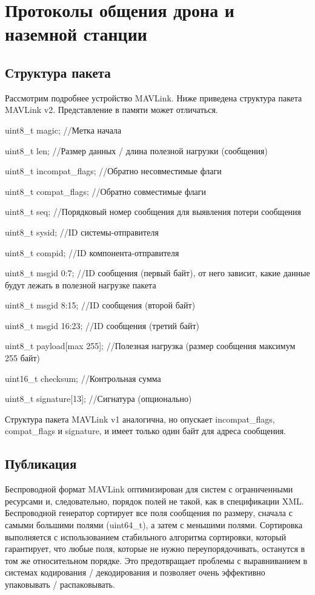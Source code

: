 
\section{Протоколы общения дрона и наземной станции}
\subsection{Структура пакета}
Рассмотрим подробнее устройство MAVLink. Ниже приведена структура пакета MAVLink v2. Представление в памяти может отличаться.

uint8\_t magic;              //Метка начала

uint8\_t len;                //Размер данных / длина полезной нагрузки (сообщения)

uint8\_t incompat\_flags;     //Обратно несовместимые флаги

uint8\_t compat\_flags;       //Обратно совместимые флаги

uint8\_t seq;                //Порядковый номер сообщения для выявления потери сообщения

uint8\_t sysid;              //ID системы-отправителя

uint8\_t compid;             //ID компонента-отправителя

uint8\_t msgid 0:7;          //ID сообщения (первый байт), от него зависит, какие данные будут лежать в полезной нагрузке пакета

uint8\_t msgid 8:15;         //ID сообщения (второй байт)

uint8\_t msgid 16:23;        //ID сообщения (третий байт)

uint8\_t payload[max 255];   //Полезная нагрузка (размер сообщения максимум 255 байт) 

uint16\_t checksum;          //Контрольная сумма

uint8\_t signature[13];      //Сигнатура (опционально)

Структура пакета MAVLink v1 аналогична, но опускает incompat\_flags, compat\_flags и signature, и имеет только один байт для адреса сообщения.


\subsection{Публикация}
Беспроводной формат MAVLink оптимизирован для систем с ограниченными ресурсами и, следовательно, порядок полей не такой, как в спецификации XML. Беспроводной генератор сортирует все поля сообщения по размеру, сначала с самыми большими полями (uint64\_t), а затем с меньшими полями. Сортировка выполняется с использованием стабильного алгоритма сортировки, который гарантирует, что любые поля, которые не нужно переупорядочивать, останутся в том же относительном порядке. Это предотвращает проблемы с выравниванием в системах кодирования / декодирования и позволяет очень эффективно упаковывать / распаковывать.

